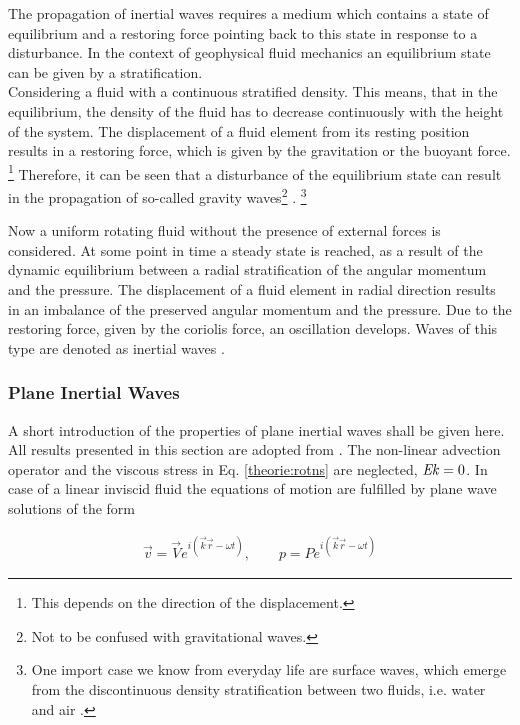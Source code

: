 The propagation of inertial waves requires a medium which contains a state of equilibrium and
a restoring force pointing back to this state in response to a disturbance.
In the context of geophysical fluid mechanics an equilibrium state can be given by a stratification.\\
Considering a fluid with a continuous stratified density.
This means, that in the equilibrium, the density of the fluid has to decrease
continuously with the height of the system. The displacement of a fluid element
 from its resting position results in a restoring force, which is  given by the
gravitation or the buoyant force.
\footnote{This depends on the direction of the displacement.}
Therefore, it can be seen that a disturbance of the equilibrium state can result in the
propagation of so-called  gravity waves\footnote{Not to be confused with gravitational waves.}
\cite{Clausen2011}.
\footnote{One import case we know from everyday life are surface waves, which emerge
from the discontinuous density stratification between two fluids, i.e. water and air \cite{Clausen2011}.}

Now a uniform rotating fluid without the presence of external forces is considered.
At some point in time a steady state is reached, as a result of the dynamic equilibrium between
a radial stratification of the angular momentum and the pressure.
The displacement of a fluid element in radial direction results in
an imbalance of the preserved angular momentum and the pressure.
Due to the restoring force, given by the coriolis force, an oscillation develops.
Waves of this type are denoted as inertial waves \cite{Clausen2011}.

\subsubsection{Plane Inertial Waves}

A short introduction of the properties of plane inertial waves shall be given here.
All results presented in this section are adopted from \citep{Greenspan1990}.%
The non-linear advection operator and the viscous stress in Eq. \ref{theorie:rotns} are neglected, $\mbox{\textit{Ek}} =0$.
In case of  a linear inviscid fluid the equations of motion are fulfilled by plane wave solutions of the form

\begin{align}
    \vec{v} = \vec{V} e^{i(\vec{k}\vec{r}  - \omega t )}, \qquad
    p = P e^{i(\vec{k}\vec{r}  - \omega t )}
\end{align}

